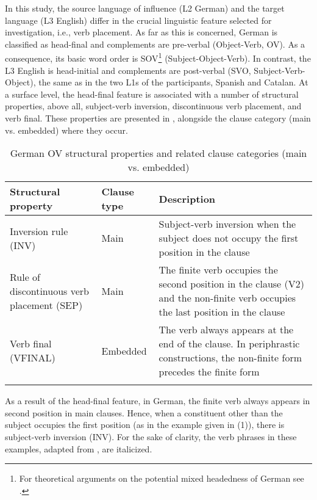 \documentclass[output=paper,modfonts,nonflat, newtxmath]{langsci/langscibook}
\begin{document}
In this study, the source language of influence (L2 German) and the target language (L3 English) differ in the crucial linguistic feature selected for investigation, i.e., verb placement. As far as this is concerned, German is classified as head-final \citep{Beck1998} and complements are pre-verbal (Object-Verb, OV). As a consequence, its basic word order is SOV\footnote{For theoretical arguments on the potential mixed headedness of German see \citet{Abraham1992}.}  (Subject-Object-Verb). In contrast, the L3 English is head-initial and complements are post-verbal (SVO, Subject-Verb-Object), the same as in the two L1s of the participants, Spanish and Catalan. At a surface level, the head-final feature is associated with a number of structural properties, above all, subject-verb inversion, discontinuous verb placement, and verb final. These properties are presented in , alongside the clause category (main vs. embedded) where they occur.

\begin{table}
\caption{German OV structural properties and related clause categories (main vs. embedded)\label{tab:sanchez7:1}}
\begin{tabularx}{\textwidth}{Q l Q}
\lsptoprule
 Structural property & Clause type & Description\\
 \midrule
Inversion rule (INV) & Main & Subject-verb inversion when the subject does not occupy the first position in the clause\\
\tablevspace
Rule of discontinuous verb placement (SEP) & Main & The finite verb occupies the second position in the clause (V2) and the non-finite verb occupies the last position in the clause\\
\tablevspace
Verb final (VFINAL) & Embedded & The verb always appears at the end of the clause. In periphrastic constructions, the non-finite form precedes the finite form\\
\lspbottomrule
\end{tabularx}
\end{table}

As a result of the head-final feature, in German, the finite verb always appears in second position in main clauses. Hence, when a constituent other than the subject occupies the first position (as in the example given in (1)), there is subject-verb inversion (INV). For the sake of clarity, the verb phrases in these examples, adapted from \citet{Sánchez2016}, are italicized.
\end{document}
